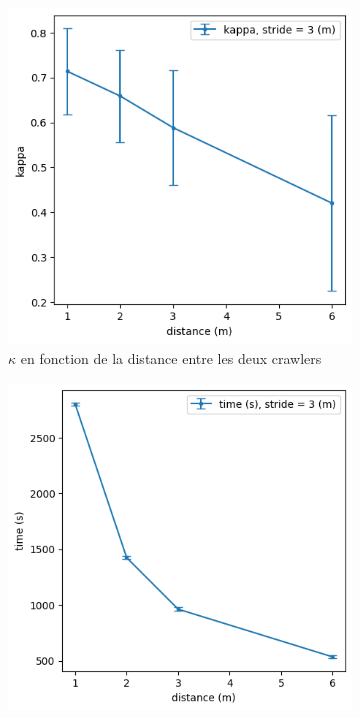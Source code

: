\documentclass[english,RandD]{rapportPFE}  %
\begin{document}
			\begin{figure}[h!]
				\begin{subfigure}[t]{0.49\linewidth}
					\includegraphics[width=\linewidth]{graphics/ski_nordique-kappa_vs_distance.png}
					\caption{$\kappa$ en fonction de la distance entre les deux crawlers}
					\label{fig:ski_nordique-kappa_vs_distance}
				\end{subfigure}
				\hfill
				\begin{subfigure}[t]{0.49\linewidth}
						\includegraphics[width=\linewidth]{graphics/ski_nordique-time_vs_distance.png}

\end{subfigure}
\end{figure}
\end{document}

